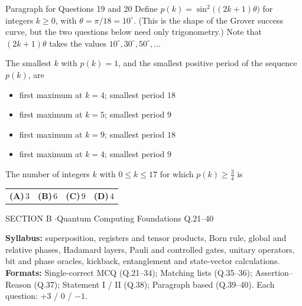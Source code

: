 \documentclass[11pt,a4paper]{article}
\newcommand{\optlabel}[1]{\textbf{(#1)}}
\newenvironment{qitem}[1]{\begin{list}{}{\setlength{\leftmargin}{3.3em}\setlength{\labelwidth}{3.1em}%
  \setlength{\labelsep}{0.2em}\setlength{\topsep}{3pt}\setlength{\parsep}{3pt}}\item[\textbf{Q.#1}\hfill]}{\end{list}}
\newcommand{\qsep}{\par\vspace{2pt}{\color{black!15}\hrule}\vspace{4pt}}
\begin{document}
\begin{passagebox}{Paragraph for Questions 19 and 20}
Define $p(k) = \sin^2\big((2k+1)\theta\big)$ for integers $k \ge 0$, with $\theta = \pi/18 = 10^\circ$. (This is the
shape of the Grover success curve, but the two questions below need only trigonometry.) Note that $(2k+1)\theta$ takes the
values $10^\circ, 30^\circ, 50^\circ, \dots$
\end{passagebox}
\begin{qitem}{19}
The smallest $k$ with $p(k) = 1$, and the smallest positive period of the sequence $p(k)$, are
\begin{itemize}[leftmargin=2.6em, labelsep=0.4em, itemsep=2pt, topsep=3pt]
\item[\optlabel{A}] first maximum at $k = 4$; smallest period $18$
\item[\optlabel{B}] first maximum at $k = 5$; smallest period $9$
\item[\optlabel{C}] first maximum at $k = 9$; smallest period $18$
\item[\optlabel{D}] first maximum at $k = 4$; smallest period $9$
\end{itemize}
\end{qitem}
\qsep

\begin{qitem}{20}
The number of integers $k$ with $0 \le k \le 17$ for which $p(k) \ge \tfrac34$ is
\par\smallskip\noindent\begin{tabularx}{\linewidth}{@{}*{4}{L}@{}}
\optlabel{A}\,$3$ & \optlabel{B}\,$6$ & \optlabel{C}\,$9$ & \optlabel{D}\,$4$
\end{tabularx}
\end{qitem}
\qsep

\newpage

\begin{sectionbanner}SECTION B \enspace$\cdot$\enspace Quantum Computing Foundations \hfill Q.21--40\end{sectionbanner}

{\small \textbf{Syllabus:} superposition, registers and tensor products, Born rule, global and relative phases, Hadamard layers, Pauli and controlled gates, unitary operators, bit and phase oracles, kickback, entanglement and state-vector calculations.\\ \textbf{Formats:} Single-correct MCQ (Q.21--34); Matching lists (Q.35--36); Assertion--Reason (Q.37); Statement I / II (Q.38); Paragraph based (Q.39--40). Each question: $+3$ / $0$ / $-1$.}
\par\medskip
\end{document}
